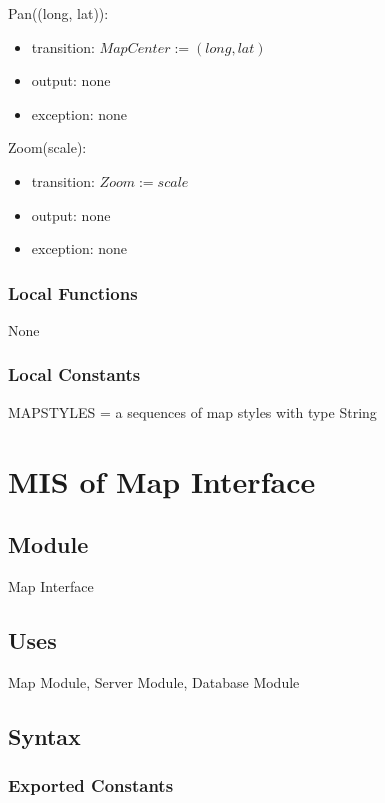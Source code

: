 \documentclass[12pt, titlepage]{article}
\begin{document}
\noindent Pan((long, lat)):
\begin{itemize}
\item transition: $MapCenter := (long, lat)$
\item output: none
\item exception: none
\end{itemize}

\noindent Zoom(scale):
\begin{itemize}
\item transition: $Zoom := scale$
\item output: none
\item exception: none
\end{itemize}

\subsubsection{Local Functions}

None

\subsubsection{Local Constants}

MAPSTYLES = a sequences of map styles with type String
 
\newpage

\section{MIS of Map Interface} \label{mMapInterface}

\subsection{Module}

Map Interface

\subsection{Uses}

Map Module, Server Module, Database Module

\subsection{Syntax}

\subsubsection{Exported Constants}
\end{document}
